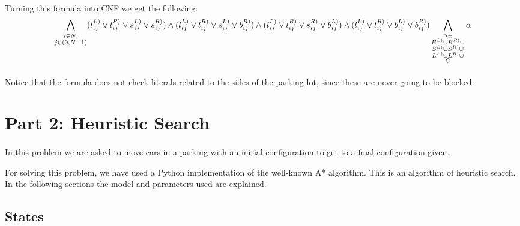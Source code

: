 \paragraph{}
Turning this formula into CNF we get the following:
\begin{equation}
  \bigwedge_{\substack{i \in N,\\ j \in (0, N-1)}}
  (l^{L)}_{ij} \lor l^{R)}_{ij} \lor s^{L)}_{ij} \lor s^{R)}_{ij}) \land
  (l^{L)}_{ij} \lor l^{R)}_{ij} \lor s^{L)}_{ij} \lor b^{R)}_{ij}) \land
  (l^{L)}_{ij} \lor l^{R)}_{ij} \lor s^{R)}_{ij} \lor b^{L)}_{ij}) \land
  (l^{L)}_{ij} \lor l^{R)}_{ij} \lor b^{L)}_{ij} \lor b^{R)}_{ij})
  \bigwedge_{\substack{
      \alpha \in\\
      B^{L)} \cup
      B^{R)} \cup \\
      S^{L)} \cup
      S^{R)} \cup \\
      L^{L)} \cup
      L^{R)} \cup \\
      C
    }}
    \alpha
\end{equation}

\paragraph{}
Notice that the formula does not check literals related to the sides of the parking lot, since these are never going to be blocked.


\section{Part 2: Heuristic Search}

\paragraph{}
In this problem we are asked to move cars in a parking with an initial
configuration to get to a final configuration given.

For solving this problem, we have used a Python implementation of the well-known
A* algorithm. This is an algorithm of heuristic search. In the following
sections the model and parameters used are explained.

\subsection{States}

